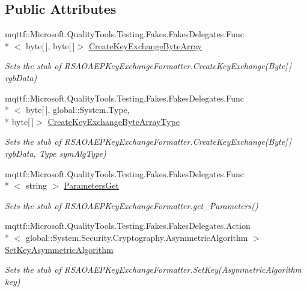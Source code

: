 \subsection*{Public Attributes}
\begin{DoxyCompactItemize}
\item 
mqttf\-::\-Microsoft.\-Quality\-Tools.\-Testing.\-Fakes.\-Fakes\-Delegates.\-Func\\*
$<$ byte\mbox{[}$\,$\mbox{]}, byte\mbox{[}$\,$\mbox{]}$>$ \hyperlink{class_system_1_1_security_1_1_cryptography_1_1_fakes_1_1_stub_r_s_a_o_a_e_p_key_exchange_formatter_a3ec7899ffdfd548dfa4ea72853656707}{Create\-Key\-Exchange\-Byte\-Array}
\begin{DoxyCompactList}\small\item\em Sets the stub of R\-S\-A\-O\-A\-E\-P\-Key\-Exchange\-Formatter.\-Create\-Key\-Exchange(\-Byte\mbox{[}$\,$\mbox{]} rgb\-Data)\end{DoxyCompactList}\item 
mqttf\-::\-Microsoft.\-Quality\-Tools.\-Testing.\-Fakes.\-Fakes\-Delegates.\-Func\\*
$<$ byte\mbox{[}$\,$\mbox{]}, global\-::\-System.\-Type, \\*
byte\mbox{[}$\,$\mbox{]}$>$ \hyperlink{class_system_1_1_security_1_1_cryptography_1_1_fakes_1_1_stub_r_s_a_o_a_e_p_key_exchange_formatter_a57c4fde86d149bf0c591f023d7e62b5f}{Create\-Key\-Exchange\-Byte\-Array\-Type}
\begin{DoxyCompactList}\small\item\em Sets the stub of R\-S\-A\-O\-A\-E\-P\-Key\-Exchange\-Formatter.\-Create\-Key\-Exchange(\-Byte\mbox{[}$\,$\mbox{]} rgb\-Data, Type sym\-Alg\-Type)\end{DoxyCompactList}\item 
mqttf\-::\-Microsoft.\-Quality\-Tools.\-Testing.\-Fakes.\-Fakes\-Delegates.\-Func\\*
$<$ string $>$ \hyperlink{class_system_1_1_security_1_1_cryptography_1_1_fakes_1_1_stub_r_s_a_o_a_e_p_key_exchange_formatter_a87e2aafa214a2085bd60bfb5a1214f4c}{Parameters\-Get}
\begin{DoxyCompactList}\small\item\em Sets the stub of R\-S\-A\-O\-A\-E\-P\-Key\-Exchange\-Formatter.\-get\-\_\-\-Parameters()\end{DoxyCompactList}\item 
mqttf\-::\-Microsoft.\-Quality\-Tools.\-Testing.\-Fakes.\-Fakes\-Delegates.\-Action\\*
$<$ global\-::\-System.\-Security.\-Cryptography.\-Asymmetric\-Algorithm $>$ \hyperlink{class_system_1_1_security_1_1_cryptography_1_1_fakes_1_1_stub_r_s_a_o_a_e_p_key_exchange_formatter_a483d5a9bc9c3feb38e75a051628524e9}{Set\-Key\-Asymmetric\-Algorithm}
\begin{DoxyCompactList}\small\item\em Sets the stub of R\-S\-A\-O\-A\-E\-P\-Key\-Exchange\-Formatter.\-Set\-Key(\-Asymmetric\-Algorithm key)\end{DoxyCompactList}\end{DoxyCompactItemize}
